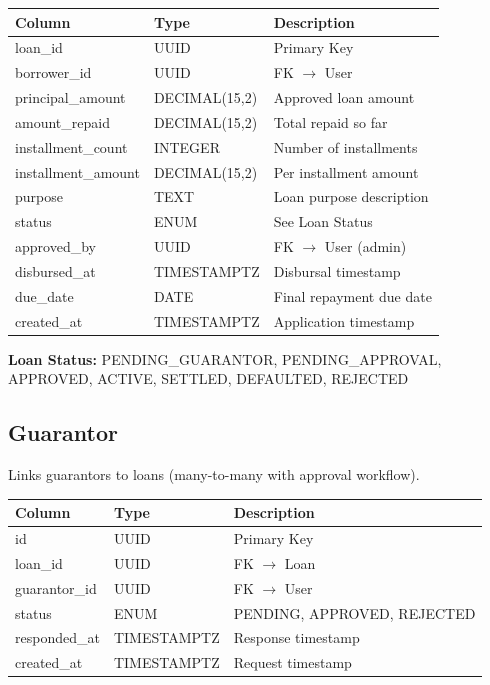 \documentclass[11pt,a4paper]{article}
\begin{document}
\begin{tabular}{@{}p{4cm}p{3cm}p{6cm}@{}}
\toprule
\textbf{Column} & \textbf{Type} & \textbf{Description} \\
\midrule
loan\_id & UUID & Primary Key \\
borrower\_id & UUID & FK $\rightarrow$ User \\
principal\_amount & DECIMAL(15,2) & Approved loan amount \\
amount\_repaid & DECIMAL(15,2) & Total repaid so far \\
installment\_count & INTEGER & Number of installments \\
installment\_amount & DECIMAL(15,2) & Per installment amount \\
purpose & TEXT & Loan purpose description \\
status & ENUM & See Loan Status \\
approved\_by & UUID & FK $\rightarrow$ User (admin) \\
disbursed\_at & TIMESTAMPTZ & Disbursal timestamp \\
due\_date & DATE & Final repayment due date \\
created\_at & TIMESTAMPTZ & Application timestamp \\
\bottomrule
\end{tabular}

\vspace{1em}
\textbf{Loan Status:} PENDING\_GUARANTOR, PENDING\_APPROVAL, APPROVED, ACTIVE, SETTLED, DEFAULTED, REJECTED

\subsection{Guarantor}

Links guarantors to loans (many-to-many with approval workflow).

\begin{tabular}{@{}p{4cm}p{3cm}p{6cm}@{}}
\toprule
\textbf{Column} & \textbf{Type} & \textbf{Description} \\
\midrule
id & UUID & Primary Key \\
loan\_id & UUID & FK $\rightarrow$ Loan \\
guarantor\_id & UUID & FK $\rightarrow$ User \\
status & ENUM & PENDING, APPROVED, REJECTED \\
responded\_at & TIMESTAMPTZ & Response timestamp \\
created\_at & TIMESTAMPTZ & Request timestamp \\
\bottomrule
\end{tabular}
\end{document}
